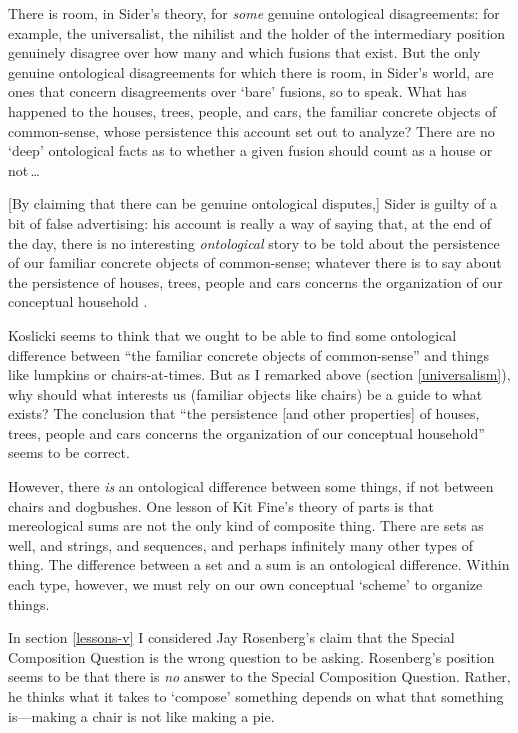 \documentclass[11pt]{article}
\newenvironment{squote}{%
\begin{spacing}{1}
\begin{list}{}{%
\setlength{\labelwidth}{0pt}%
\rightmargin\leftmargin%
}
\item\relax
}{%
\end{list}%
\end{spacing}
}
\begin{document}
\begin{spacing}{1.5}
\begin{squote}
There is room, in Sider's theory, for {\em some} genuine ontological
disagreements: for example, the universalist, the nihilist and the
holder of the intermediary position genuinely disagree over how many
and which fusions that exist.  But the only genuine ontological
disagreements for which there is room, in Sider's world, are ones that
concern disagreements over `bare' fusions, so to speak.  What has
happened to the houses, trees, people, and cars, the familiar concrete
objects of common-sense, whose persistence this account set out to
analyze?  There are no `deep' ontological facts as to whether a given
fusion should count as a house or not\,\ldots

[By claiming that there can be genuine ontological disputes,] Sider is
guilty of a bit of false advertising: his account is really a way of
saying that, at the end of the day, there is no interesting {\em
  ontological} story to be told about the persistence of our familiar
concrete objects of common-sense; whatever there is to say about the
persistence of houses, trees, people and cars concerns the
organization of our conceptual household
\citeyearpar[124--125]{koslicki2003}.
\end{squote}

Koslicki seems to think that we ought to be able to find some
ontological difference between ``the familiar concrete objects of
common-sense'' and things like lumpkins or chairs-at-times.  But as I
remarked above (section \ref{universalism}), why should what interests
us (familiar objects like chairs) be a guide to what exists?  The
conclusion that ``the persistence [and other properties] of houses,
trees, people and cars concerns the organization of our conceptual
household'' seems to be correct.

However, there {\em is} an ontological difference between some things,
if not between chairs and dogbushes.  One lesson of Kit Fine's theory
of parts is that mereological sums are not the only kind of composite
thing.  There are sets as well, and strings, and sequences, and
perhaps infinitely many other types of thing.  The difference between
a set and a sum is an ontological difference.  Within each type,
however, we must rely on our own conceptual `scheme' to organize
things.

In section \ref{lessons-v} I considered Jay Rosenberg's claim that
the Special Composition Question is the wrong question to be asking.
Rosenberg's position seems to be that there is {\em no} answer to the
Special Composition Question.  Rather, he thinks what it takes to
`compose' something depends on what that something is---making a chair
is not like making a pie.


\end{spacing}
\end{document}
